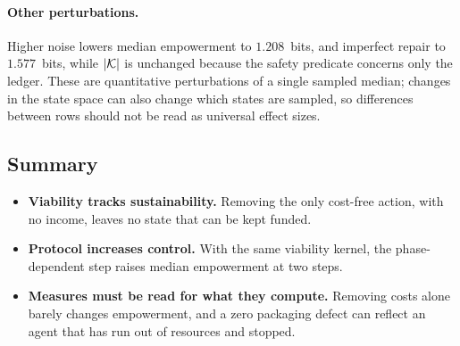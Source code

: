\paragraph{Other perturbations.}
Higher noise lowers median empowerment to $1.208$~bits, and imperfect repair to $1.577$~bits, while $|\mathcal{K}|$ is unchanged because the safety predicate concerns only the ledger. These are quantitative perturbations of a single sampled median; changes in the state space can also change which states are sampled, so differences between rows should not be read as universal effect sizes.

\subsection{Summary}
\begin{itemize}[leftmargin=*, itemsep=0.25em]
  \item \textbf{Viability tracks sustainability.} Removing the only cost-free action, with no income, leaves no state that can be kept funded.
  \item \textbf{Protocol increases control.} With the same viability kernel, the phase-dependent step raises median empowerment at two steps.
  \item \textbf{Measures must be read for what they compute.} Removing costs alone barely changes empowerment, and a zero packaging defect can reflect an agent that has run out of resources and stopped.
\end{itemize}
